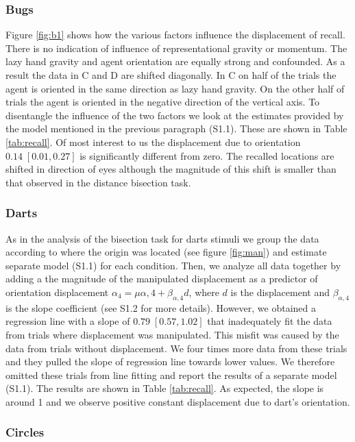 \documentclass[10pt]{article}
\begin{document}
\subsubsection*{Bugs}
Figure \ref{fig:b1} shows how the various factors influence the displacement of recall. There is no indication of influence of representational gravity or momentum. The lazy hand gravity and agent orientation are equally strong and confounded. As a result the data in C and D are shifted diagonally. In C on half of the trials the agent is oriented in the same direction as lazy hand gravity. On the other half of trials the agent is oriented in the negative direction of the vertical axis. To disentangle the influence of the two factors we look at the estimates provided by the model mentioned in the previous paragraph (S1.1). These are shown in Table \ref{tab:recall}. Of most interest to us the displacement due to orientation $0.14 \; [0.01,0.27]$ is significantly different from zero. The recalled locations are shifted in direction of eyes although the magnitude of this shift is smaller than that observed in the distance bisection task.\\

\subsubsection*{Darts}
As in the analysis of the bisection task for darts stimuli we group the data according to where the origin was located (see figure \ref{fig:man}) and estimate separate model (S1.1) for each condition. Then, we analyze all data together by adding a the magnitude of the manipulated displacement as a predictor of orientation displacement $\alpha_4 = \mu{\alpha,4}+ \beta_{\alpha,4}d $, where $d$ is the displacement and $\beta_{\alpha,4}$ is the slope coefficient (see S1.2 for more details). However, we obtained a regression line with a slope of $0.79 \; [0.57,1.02]$ that inadequately fit the data from trials where displacement was manipulated. This misfit was caused by the data from trials without displacement. We four times more data from these trials and they pulled the slope of regression line towards lower values. We therefore omitted these trials from line fitting and report the results of a separate model (S1.1). The results are shown in Table \ref{tab:recall}. As expected, the slope is around 1 and we observe positive constant displacement due to dart's orientation.

\subsubsection*{Circles}
\end{document}
